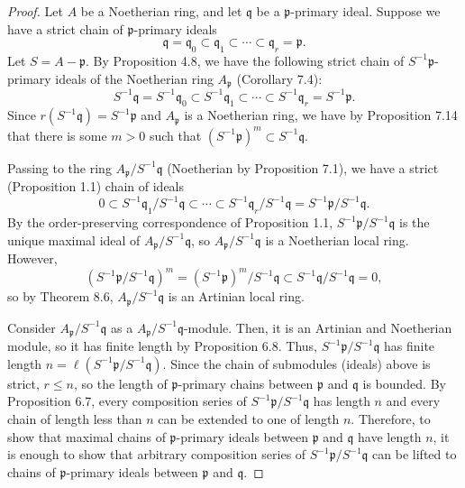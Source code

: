 \begin{proof}
Let $A$ be a Noetherian ring, and let $\mathfrak{q}$ be a $\mathfrak{p}$-primary ideal. Suppose we have a strict chain of $\mathfrak{p}$-primary ideals 
$$\mathfrak{q} = \mathfrak{q}_0 \subset \mathfrak{q}_1 \subset \cdots \subset \mathfrak{q}_r = \mathfrak{p}.$$
Let $S = A-\mathfrak{p}$. By Proposition 4.8, we have the following strict chain of $S^{-1}\mathfrak{p}$-primary ideals of the Noetherian ring 
$A_{\mathfrak{p}}$ (Corollary 7.4):
$$S^{-1}\mathfrak{q} = S^{-1}\mathfrak{q}_0 \subset S^{-1}\mathfrak{q}_1 \subset \cdots \subset S^{-1}\mathfrak{q}_r = S^{-1}\mathfrak{p}.$$
Since $r(S^{-1}\mathfrak{q}) = S^{-1}\mathfrak{p}$ and $A_{\mathfrak{p}}$ is a Noetherian ring, we have by Proposition 7.14 that there is some $m > 0$
such that $(S^{-1}\mathfrak{p})^m \subset S^{-1}\mathfrak{q}$.

Passing to the ring $A_{\mathfrak{p}}/S^{-1}\mathfrak{q}$ (Noetherian by Proposition 7.1), we have a strict (Proposition 1.1) chain of ideals
$$0 \subset S^{-1}\mathfrak{q}_1/S^{-1}\mathfrak{q} \subset \cdots \subset S^{-1}\mathfrak{q}_r/S^{-1}\mathfrak{q} = S^{-1}\mathfrak{p}/S^{-1}\mathfrak{q}.$$
By the order-preserving correspondence of Proposition 1.1, $S^{-1}\mathfrak{p}/S^{-1}\mathfrak{q}$ is the unique maximal ideal of $A_{\mathfrak{p}}/S^{-1}\mathfrak{q}$,
so $A_{\mathfrak{p}}/S^{-1}\mathfrak{q}$ is a Noetherian local ring. However, 
$$(S^{-1}\mathfrak{p}/S^{-1}\mathfrak{q})^m = (S^{-1}\mathfrak{p})^m/S^{-1}\mathfrak{q} \subset S^{-1}\mathfrak{q}/S^{-1}\mathfrak{q} = 0,$$
so by Theorem 8.6, $A_{\mathfrak{p}}/S^{-1}\mathfrak{q}$ is an Artinian local ring.

Consider $A_{\mathfrak{p}}/S^{-1}\mathfrak{q}$ as a $A_{\mathfrak{p}}/S^{-1}\mathfrak{q}$-module. Then, it is an Artinian and Noetherian module, so it has finite length by Proposition 6.8.
Thus, $S^{-1}\mathfrak{p}/S^{-1}\mathfrak{q}$ has finite length $n = \ell(S^{-1}\mathfrak{p}/S^{-1}\mathfrak{q})$. Since the chain of submodules (ideals) above is strict, $r \le n$, so the length of $\mathfrak{p}$-primary chains 
between $\mathfrak{p}$ and $\mathfrak{q}$ is bounded. By Proposition 6.7, every composition series of $S^{-1}\mathfrak{p}/S^{-1}\mathfrak{q}$ has length $n$ and every chain of 
length less than $n$ can be extended to one of length $n$.
Therefore, to show that maximal chains of $\mathfrak{p}$-primary ideals between $\mathfrak{p}$ and $\mathfrak{q}$ have length $n$, it is enough to show that arbitrary composition
series of $S^{-1}\mathfrak{p}/S^{-1}\mathfrak{q}$ can be lifted to chains of $\mathfrak{p}$-primary ideals between $\mathfrak{p}$ and $\mathfrak{q}$.


\end{proof}
